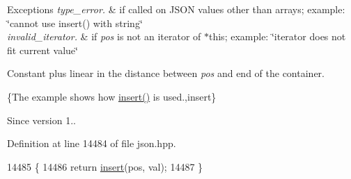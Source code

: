 \begin{DoxyExceptions}{Exceptions}
{\em type\+\_\+error.} & if called on J\+S\+ON values other than arrays; example\+: {\ttfamily \char`\"{}cannot use insert() with string\char`\"{}} \\
\hline
{\em invalid\+\_\+iterator.} & if {\itshape pos} is not an iterator of $\ast$this; example\+: {\ttfamily \char`\"{}iterator does not fit current value\char`\"{}}\\
\hline
\end{DoxyExceptions}
Constant plus linear in the distance between {\itshape pos} and end of the container.

\{The example shows how {\ttfamily \hyperlink{classnlohmann_1_1basic__json_a0136728f5db69d4051c77b94307abd6c}{insert()}} is used.,insert\}

\begin{DoxySince}{Since}
version 1.. 
\end{DoxySince}


Definition at line 14484 of file json.\+hpp.


\begin{DoxyCode}
14485     \{
14486         \textcolor{keywordflow}{return} \hyperlink{classnlohmann_1_1basic__json_a0136728f5db69d4051c77b94307abd6c}{insert}(pos, val);
14487     \}
\end{DoxyCode}
\mbox{\label{classnlohmann_1_1basic__json_a30a7cc24f2931c20ecae37ec4a5e901f}} 
